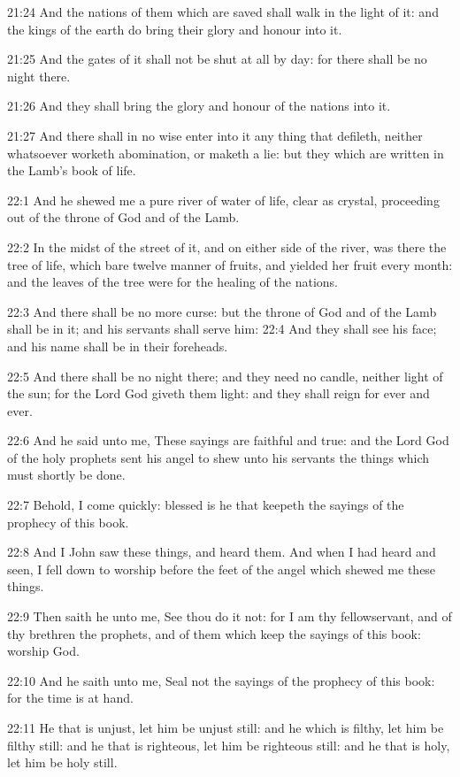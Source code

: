 21:24 And the nations of them which are saved shall walk in the light of it: and the kings of the earth do bring their glory and honour into it.

21:25 And the gates of it shall not be shut at all by day: for there shall be no night there.

21:26 And they shall bring the glory and honour of the nations into it.

21:27 And there shall in no wise enter into it any thing that defileth, neither whatsoever worketh abomination, or maketh a lie: but they which are written in the Lamb's book of life.

22:1 And he shewed me a pure river of water of life, clear as crystal, proceeding out of the throne of God and of the Lamb.

22:2 In the midst of the street of it, and on either side of the river, was there the tree of life, which bare twelve manner of fruits, and yielded her fruit every month: and the leaves of the tree were for the healing of the nations.

22:3 And there shall be no more curse: but the throne of God and of the Lamb shall be in it; and his servants shall serve him: 22:4 And they shall see his face; and his name shall be in their foreheads.

22:5 And there shall be no night there; and they need no candle, neither light of the sun; for the Lord God giveth them light: and they shall reign for ever and ever.

22:6 And he said unto me, These sayings are faithful and true: and the Lord God of the holy prophets sent his angel to shew unto his servants the things which must shortly be done.

22:7 Behold, I come quickly: blessed is he that keepeth the sayings of the prophecy of this book.

22:8 And I John saw these things, and heard them. And when I had heard and seen, I fell down to worship before the feet of the angel which shewed me these things.

22:9 Then saith he unto me, See thou do it not: for I am thy fellowservant, and of thy brethren the prophets, and of them which keep the sayings of this book: worship God.

22:10 And he saith unto me, Seal not the sayings of the prophecy of this book: for the time is at hand.

22:11 He that is unjust, let him be unjust still: and he which is filthy, let him be filthy still: and he that is righteous, let him be righteous still: and he that is holy, let him be holy still.

